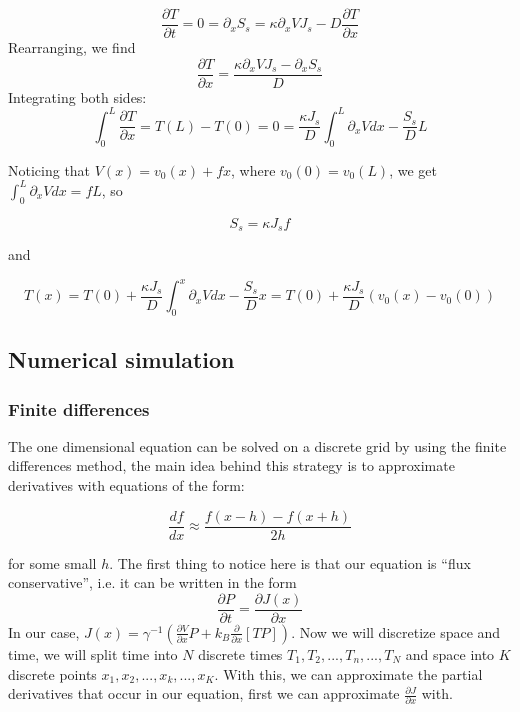 \documentclass[11pt]{article} %
\begin{document}
\begin{equation}
\frac{\partial T}{\partial t} = 0 =  \partial_x S_s = \kappa \partial_x V J_s - D \frac{\partial T}{\partial x}
\end{equation}
Rearranging, we find
\begin{equation}
\frac{\partial T}{\partial x} = \frac{\kappa \partial_x V J_s - \partial_x S_s}{D}
\end{equation}
Integrating both sides:
\begin{equation}
\int_0^L \frac{\partial T}{\partial x} = T(L) - T(0) = 0 = \frac{\kappa J_s}{D} \int_0^L \partial_x V dx - \frac{S_s}{D}L
\end{equation}

Noticing that $V(x) = v_0(x) + f x$, where $v_0(0) = v_0(L)$, we get $\int_0^L \partial_x V dx = f L$, so 

\begin{equation}
S_s = \kappa J_s f
\end{equation}

and

\begin{equation}T(x) = T(0) + \frac{\kappa J_s}{D} \int_0^x \partial_x V dx - \frac{S_s}{D}x = T(0) + \frac{\kappa J_s}{D} (v_0(x) - v_0(0))
\end{equation}



\subsection{Numerical simulation} \label{numerics}

\subsubsection{Finite differences}
The one dimensional equation can be solved on a discrete grid by using the finite differences method, the main idea behind this strategy is to approximate derivatives with equations of the form:

\begin{equation}
\frac{d f}{d x} \approx \frac{f(x - h) - f(x + h)}{2h}
\end{equation}

for some small $h$. The first thing to notice here is that our equation is ``flux conservative'', i.e. it can be written in the form 
$$ \frac{\partial P}{\partial t} = \frac{\partial J(x)}{\partial x} $$
In our case, $J(x) = \gamma^{-1} \left ( \frac{\partial V}{\partial x} P + k_B \frac{\partial}{\partial x} [T P] \right ) $. Now we will discretize space and time, we will split time into $N$ discrete times  $T_1, T_2, ..., T_n, ..., T_N$ and space into $K$ discrete points $x_1, x_2, ..., x_k, ..., x_K$. With this, we can approximate the partial derivatives that occur in our equation, first we can approximate $\frac{\partial J}{\partial x}$ with.
\end{document}
